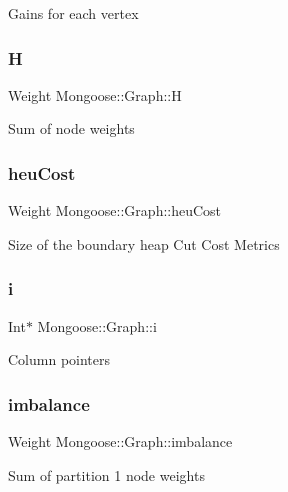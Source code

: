 Gains for each vertex \hypertarget{class_mongoose_1_1_graph_a12a68e1a79d1fe8de7e607e7450b4d75}{}\label{class_mongoose_1_1_graph_a12a68e1a79d1fe8de7e607e7450b4d75} 
\subsubsection{\texorpdfstring{H}{H}}
{\footnotesize\ttfamily Weight Mongoose\+::\+Graph\+::H}

Sum of node weights \hypertarget{class_mongoose_1_1_graph_ae4a5a338b693910d94884ff817cfc5de}{}\label{class_mongoose_1_1_graph_ae4a5a338b693910d94884ff817cfc5de} 
\subsubsection{\texorpdfstring{heu\+Cost}{heuCost}}
{\footnotesize\ttfamily Weight Mongoose\+::\+Graph\+::heu\+Cost}

Size of the boundary heap Cut Cost Metrics \hypertarget{class_mongoose_1_1_graph_aa8a772a57613d0a3f1fd705c45dd119d}{}\label{class_mongoose_1_1_graph_aa8a772a57613d0a3f1fd705c45dd119d} 
\subsubsection{\texorpdfstring{i}{i}}
{\footnotesize\ttfamily Int$\ast$ Mongoose\+::\+Graph\+::i}

Column pointers \hypertarget{class_mongoose_1_1_graph_a42f86f519bb3f579131cbd4b95949caa}{}\label{class_mongoose_1_1_graph_a42f86f519bb3f579131cbd4b95949caa} 
\subsubsection{\texorpdfstring{imbalance}{imbalance}}
{\footnotesize\ttfamily Weight Mongoose\+::\+Graph\+::imbalance}

Sum of partition 1 node weights \hypertarget{class_mongoose_1_1_graph_a2f26902e9aa3aa9e29088da9af230a9b}{}\label{class_mongoose_1_1_graph_a2f26902e9aa3aa9e29088da9af230a9b} 
